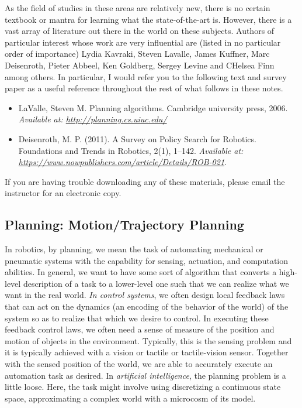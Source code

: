 As the field of studies in these areas are relatively new, there is no certain textbook or mantra for learning what the state-of-the-art is. However, there is a vast array of literature out there in the world on these subjects. Authors of particular interest whose work are very influential are (listed in no particular order of importance) Lydia Kavraki, Steven Lavalle, James Kuffner, Marc Deisenroth, Pieter Abbeel, Ken Goldberg, Sergey Levine and CHelsea Finn among others. In particular, I would refer you to the following text and survey paper as a useful reference throughout the rest of what follows in these notes.
%
\begin{itemize}
	\item LaValle, Steven M. Planning algorithms. Cambridge university press, 2006. \textit{Available at: \href{http://planning.cs.uiuc.edu/}{http://planning.cs.uiuc.edu/}}
	\item Deisenroth, M. P. (2011). A Survey on Policy Search for Robotics. Foundations and Trends in Robotics, 2(1), 1–142. \textit{Available at: \href{https://www.nowpublishers.com/article/Details/ROB-021}{https://www.nowpublishers.com/article/Details/ROB-021}}.
\end{itemize}
%
If you are having trouble downloading any of these materials, please email the instructor for an electronic copy.

\subsection{Planning: Motion/Trajectory Planning}

In robotics, by planning, we mean the task of automating mechanical or pneumatic systems with the capability for sensing, actuation, and computation abilities. In general, we want to have some sort of algorithm that converts a high-level description of a task to a lower-level one such that we can realize what we want in the real world. \textit{In control systems}, we often design local feedback laws that can act on the dynamics (an encoding of the behavior of the world) of the system so as to realize that which we desire to control. In executing these feedback control laws, we often need a sense of measure of the position and motion of objects in the environment. Typically, this is the sensing problem and it is typically achieved with a vision or tactile or tactile-vision sensor.  Together with the sensed position of the world, we are able to accurately execute an automation task as desired. In \textit{artificial intelligence}, the planning problem is a little loose. Here, the task might involve using discretizing a continuous state space, approximating a complex world with a microcosm of its model.   

